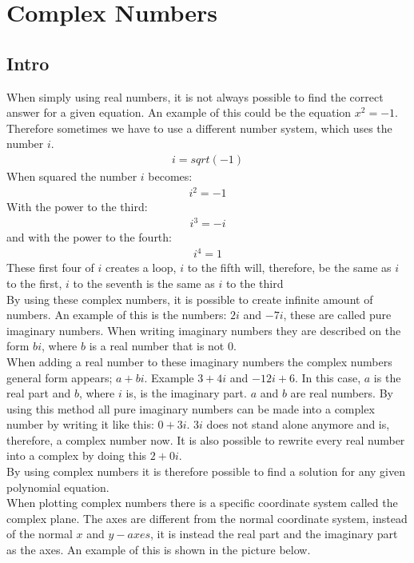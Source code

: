 \chapter{Complex Numbers}
\section{Intro}
When simply using real numbers, it is not always possible to find the correct answer for a given equation. An example of this could be the equation $x^2=-1$. Therefore sometimes we have to use a different number system, which uses the number $i$. 
\begin{align*}
i=sqrt(-1)
\end{align*}
When squared the number $i$ becomes:
\begin{align*}
i^2=-1
\end{align*}
With the power to the third:
\begin{align*}
i^3=-i
\end{align*}
and with the power to the fourth:
\begin{align*}
i^4=1
\end{align*}
These first four of $i$ creates a loop, $i$ to the fifth will, therefore, be the same as $i$ to the first, $i$ to the seventh is the same as $i$ to the third \\
By using these complex numbers, it is possible to create infinite amount of numbers.  
An example of this is the numbers: $2i$ and $-7i$, these are called pure imaginary numbers. When writing imaginary numbers they are described on the form $bi$, where $b$ is a real number that is not $0$. \\
When adding a real number to these imaginary numbers the complex numbers general form appears; $a+bi$. Example $3+4i$ and $-12i+6$. In this case, $a$ is the real part and $b$, where $i$ is, is the imaginary part. $a$ and $b$ are real numbers. By using this method all pure imaginary numbers can be made into a complex number by writing it like this: $0+3i$. $3i$ does not stand alone anymore and is, therefore, a complex number now. It is also possible to rewrite every real number into a complex by doing this $2+0i$. \\
By using complex numbers it is therefore possible to find a solution for any given polynomial equation. \\ 
When plotting complex numbers there is a specific coordinate system called the complex plane. The axes are different from the normal coordinate system, instead of the normal $x$ and $y-axes$, it is instead the real part and the imaginary part as the axes. An example of this is shown in the picture below.
